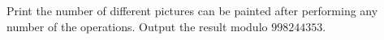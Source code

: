Print the number of different pictures can be painted after performing any number of the operations.
Output the result modulo $998244353$. 